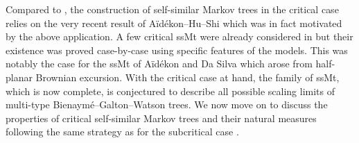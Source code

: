 \documentclass[12pt]{article}
\numberwithin{equation}{section}
\theoremstyle{plain}
\theoremstyle{definition}
\begin{document}
Compared to \cite{BertoinJean2024SMta}, the construction of self-similar Markov trees in the critical case relies on the very recent result of A\"id\'ekon--Hu--Shi \cite{AidekonElie2024Bodt} which was in fact motivated by the above application. A few critical ssMt were already considered in \cite{BertoinJean2024SMta} but their existence was proved case-by-case using specific features of the models. This was notably the case for the ssMt of A\"id\'ekon and Da Silva \cite{aidekon2022growth} which arose from half-planar Brownian excursion. With the critical case at hand, the family of ssMt, which is now complete, is conjectured to describe all possible scaling limits of multi-type Bienaym\'e--Galton--Watson trees. We now move on to discuss the properties of critical self-similar Markov trees and their natural measures following the same strategy as for the subcritical case \cite{BertoinJean2024SMta}. %
\end{document}
